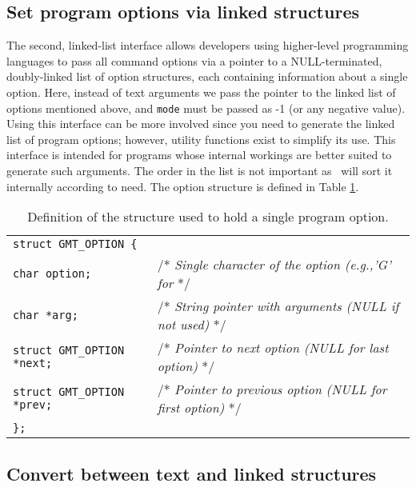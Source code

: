 \documentclass{report}
\begin{document}
\subsection{Set program options via linked structures}

The second, linked-list interface allows developers using higher-level programming languages to pass all command
options via a pointer to a NULL-terminated, doubly-linked list of option structures, each containing
information about a single option.  Here, instead of text arguments we pass the pointer to the linked list of
options mentioned above, and \texttt{mode} must be passed as -1 (or any negative value).  Using
this interface can be more involved since you need to generate the linked
list of program options; however, utility functions exist to simplify its use.
This interface is intended for programs whose internal workings are better suited to
generate such arguments.  The order in the list is not important as \GMT\ will sort it internally
according to need.  The option structure is defined in Table \ref{tbl:options}.
\begin{table}[h]
\small
\centering
\begin{tabular}{ll} \hline
\multicolumn{2}{l}{\texttt{struct GMT\_OPTION \{}} \\ 
\texttt{char option;}			&       /* \emph{Single character of the option (e.g.,'G' for} \Opt{G} */ \\
\texttt{char *arg;}			&       /* \emph{String pointer with arguments (NULL if not used)} */ \\
\texttt{struct GMT\_OPTION *next;}	&       /* \emph{Pointer to next option (NULL for last option)}  */\\
\texttt{struct GMT\_OPTION *prev;}	&       /* \emph{Pointer to previous option (NULL for first option)}  */\\
\texttt{\};}	&        \\  \hline
\end{tabular}
\caption{Definition of the structure used to hold a single program option.}
\label{tbl:options}
\end{table}

\subsection{Convert between text and linked structures}
\end{document}
